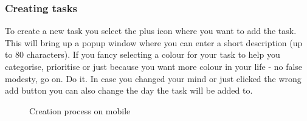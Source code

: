 \subsubsection{Creating tasks}
To create a new task you select the plus icon where you want to add the task. This will bring up a popup window where you can enter a short description (up to 80 characters). 
If you fancy selecting a colour for your task to help you categorise, prioritise or just because you want more colour in your life - no false modesty, go on. Do it. 
In case you changed your mind or just clicked the wrong add button you can also change the day the task will be added to. 

\begin{figure}
    \centering
    \qquad
    \caption{Creation process on mobile}
    \label{fig:example}
\end{figure}
 
